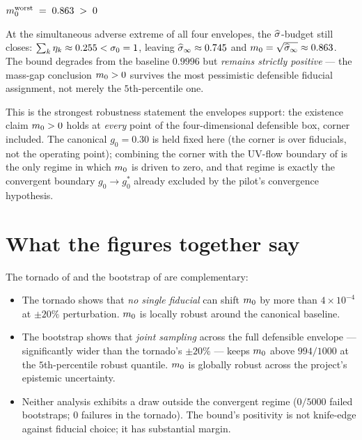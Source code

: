 \begin{infobox}[main][title=Worst-case corner: the budget still closes]
\begin{center}
\large
$m_0^{\mathrm{worst}} \;=\; 0.863 \;>\; 0$
\end{center}
At the simultaneous adverse extreme of all four envelopes, the
$\widehat{\sigma}$-budget still closes: $\sum_k \eta_k \approx 0.255 < \sigma_0 =
1$, leaving $\widehat{\sigma}_\infty \approx 0.745$ and
$m_0 = \sqrt{\widehat{\sigma}_\infty} \approx 0.863$.  The bound degrades from
the baseline $0.9996$ but \emph{remains strictly positive} --- the
mass-gap conclusion $m_0 > 0$ survives the most pessimistic
defensible fiducial assignment, not merely the $5$th-percentile one.
\end{infobox}

This is the strongest robustness statement the envelopes support: the
existence claim $m_0 > 0$ holds at \emph{every} point of the
four-dimensional defensible box, corner included.  The canonical
$g_0 = 0.30$ is held fixed here (the corner is over fiducials, not the
operating point); combining the corner with the UV-flow boundary of
 is the only regime in which $m_0$ is driven
to zero, and that regime is exactly the convergent boundary
$g_0 \to g_0^\ast$ already excluded by the pilot's convergence
hypothesis.

\section{What the figures together say}
\label{sec:appx-conclusion}

The tornado of  and the bootstrap of
 are complementary:

\begin{itemize}
  \item The tornado shows that \emph{no single fiducial} can shift
    $m_0$ by more than $4 \times 10^{-4}$ at $\pm 20\%$
    perturbation.  $m_0$ is locally robust around the canonical
    baseline.
  \item The bootstrap shows that \emph{joint sampling} across the
    full defensible envelope — significantly wider than the tornado's
    $\pm 20\%$ — keeps $m_0$ above $994/1000$ at the
    $5$th-percentile robust quantile.  $m_0$ is globally robust
    across the project's epistemic uncertainty.
  \item Neither analysis exhibits a draw outside the convergent
    regime ($0/5000$ failed bootstraps; $0$ failures in the
    tornado).  The bound's positivity is not knife-edge against
    fiducial choice; it has substantial margin.
\end{itemize}

